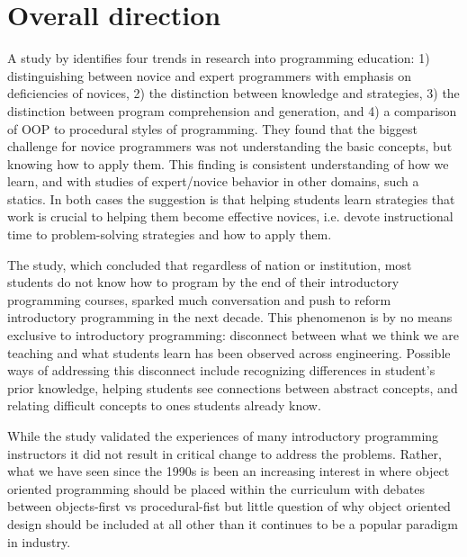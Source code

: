 \documentclass[12pt]{article}
\begin{document}
\section{Overall direction}
A \citeyear{robins_learning_2003} study by
\citeauthor{robins_learning_2003} identifies four trends in research
into programming education: 1) distinguishing between novice and
expert programmers with emphasis on deficiencies of novices, 2) the
distinction between knowledge and strategies, 3) the distinction
between program comprehension and generation, and 4) a comparison of
OOP to procedural styles of
programming\autocite{robins_learning_2003}. They found that the
biggest challenge for novice programmers was not understanding the
basic concepts, but knowing how to apply them. This finding is
consistent understanding of how we
learn\autocite{bransford_how_2000,ambrose_chapter_2010}, and with
studies of expert/novice behavior in other domains, such a
statics\autocite{litzinger_cognitive_2010}. In both cases the
suggestion is that helping students learn strategies that work is
crucial to helping them become effective novices, i.e. devote
instructional time to problem-solving strategies and how to apply
them.

The \citeyear{mccracken_multinational_2001}
\citeauthor{mccracken_multinational_2001}
study\autocite{mccracken_multinational_2001}, which concluded that
regardless of nation or institution, most students do not know how to
program by the end of their introductory programming courses, sparked
much conversation and push to reform introductory programming in the
next decade. This phenomenon is by no means exclusive to introductory
programming: disconnect between what we think we are teaching and what
students learn has been observed across
engineering\autocite{streveler_learning_2008,flynn_engineering_2014}. Possible
ways of addressing this disconnect include recognizing differences in
student's prior knowledge, helping students see connections between
abstract concepts, and relating difficult concepts to ones students
already know\autocite{streveler_learning_2008,slotta_helping_2006}.

While the \citeauthor{mccracken_multinational_2001} study validated the
experiences of many introductory programming instructors it did not
result in critical change to address the problems. Rather, what we
have seen since the 1990s is been an increasing interest in where
object oriented programming should be placed within the curriculum
with debates between objects-first vs procedural-fist but little
question of why object oriented design should be included at all other
than it continues to be a popular paradigm in industry.
\end{document}
